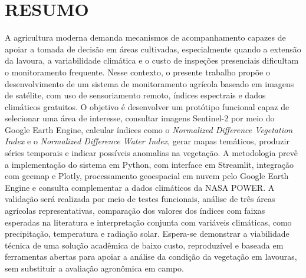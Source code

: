 \chapter{RESUMO}\label{chap:resumo}

A agricultura moderna demanda mecanismos de acompanhamento capazes de apoiar a tomada de decisão em áreas cultivadas, especialmente quando a extensão da lavoura, a variabilidade climática e o custo de inspeções presenciais dificultam o monitoramento frequente. Nesse contexto, o presente trabalho propõe o desenvolvimento de um sistema de monitoramento agrícola baseado em imagens de satélite, com uso de sensoriamento remoto, índices espectrais e dados climáticos gratuitos. O objetivo é desenvolver um protótipo funcional capaz de selecionar uma área de interesse, consultar imagens Sentinel-2 por meio do Google Earth Engine, calcular índices como o \textit{Normalized Difference Vegetation Index} e o \textit{Normalized Difference Water Index}, gerar mapas temáticos, produzir séries temporais e indicar possíveis anomalias na vegetação. A metodologia prevê a implementação do sistema em Python, com interface em Streamlit, integração com geemap e Plotly, processamento geoespacial em nuvem pelo Google Earth Engine e consulta complementar a dados climáticos da NASA POWER. A validação será realizada por meio de testes funcionais, análise de três áreas agrícolas representativas, comparação dos valores dos índices com faixas esperadas na literatura e interpretação conjunta com variáveis climáticas, como precipitação, temperatura e radiação solar. Espera-se demonstrar a viabilidade técnica de uma solução acadêmica de baixo custo, reproduzível e baseada em ferramentas abertas para apoiar a análise da condição da vegetação em lavouras, sem substituir a avaliação agronômica em campo.
